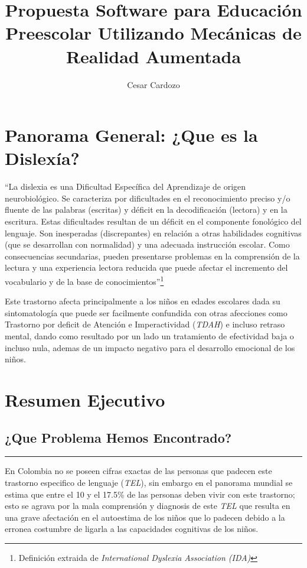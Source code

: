\documentclass[12pt,letterpaper]{article}
\author{Cesar Cardozo}
\title{Propuesta Software para Educación Preescolar Utilizando Mecánicas de Realidad Aumentada}
\begin{document}
\maketitle
\section{Panorama General: ¿Que es la Dislexía?}
“La dislexia es una Dificultad Específica del Aprendizaje de origen neurobiológico. Se caracteriza por dificultades en el reconocimiento preciso y/o fluente de las palabras (escritas) y déficit en la decodificación (lectora) y en la escritura. Estas dificultades resultan de un déficit en el componente fonológico del lenguaje. Son inesperadas (discrepantes) en relación a otras habilidades cognitivas (que se desarrollan con normalidad) y una adecuada instrucción escolar. Como consecuencias secundarias, pueden presentarse problemas en la comprensión de la lectura y una experiencia lectora reducida que puede afectar el incremento del vocabulario y de la base de conocimientos”\footnote{Definición extraida de \textit{International Dyslexia Association (IDA)}}

Este trastorno afecta principalmente a los niños en edades escolares dada su sintomatología que puede ser facilmente confundida con otras afecciones como Trastorno por deficit de Atención e Imperactividad (\textit{TDAH}) e incluso retraso mental, dando como resultado por un lado un tratamiento de efectividad baja o incluso nula, ademas de un impacto negativo para el desarrollo emocional de los niños.\\


\section{Resumen Ejecutivo}
\subsection{¿Que Problema Hemos Encontrado?}
\rule{150mm}{0.1mm} 
En Colombia no se poseen cifras exactas de las personas que padecen este trastorno especifico de lenguaje (\textit{TEL}), sin embargo en el panorama mundial se estima que entre el 10 y el 17.5\% de las personas deben vivir con este trastorno; esto se agrava por la mala comprensión y diagnosis de este \textit{TEL} que resulta en una grave afectación en el autoestima de los niños que lo padecen debido a la erronea costumbre de ligarla a las capacidades cognitivas de los niños. \\
\end{document}
